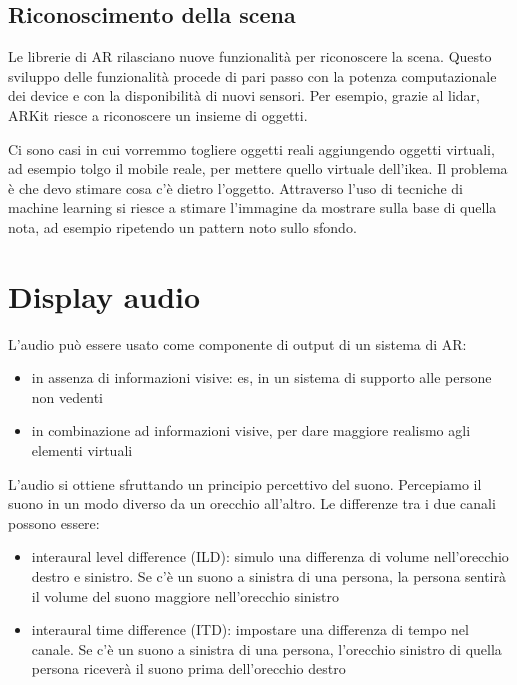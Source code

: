 \subsection{Riconoscimento della scena}
Le librerie di AR rilasciano nuove funzionalità per riconoscere la scena. 
Questo sviluppo delle funzionalità procede di pari passo con la potenza computazionale dei device e con la disponibilità di nuovi sensori. 
Per esempio, grazie al lidar, ARKit riesce a riconoscere un insieme di oggetti. 

Ci sono casi in cui vorremmo togliere oggetti reali aggiungendo oggetti virtuali, ad esempio tolgo il mobile reale, per mettere quello virtuale dell'ikea. 
Il problema è che devo stimare cosa c'è dietro l'oggetto.  Attraverso l'uso di tecniche di machine learning si riesce a stimare l'immagine da mostrare sulla base di quella nota, ad esempio ripetendo un pattern noto sullo sfondo.

\section{Display audio}
L'audio può essere usato come componente di output di un sistema di AR:
\begin{itemize}
    \item in assenza di informazioni visive: es, in un sistema di supporto alle persone non vedenti 
    \item in combinazione ad informazioni visive, per dare maggiore realismo agli elementi virtuali 
\end{itemize}

L'audio si ottiene sfruttando un principio percettivo del suono. Percepiamo il suono in un modo diverso da un orecchio all'altro.
Le differenze tra i due canali possono essere:
\begin{itemize}
    \item interaural level difference (ILD): simulo una differenza di volume nell'orecchio destro e sinistro. Se c'è un suono a sinistra di una persona, la persona sentirà il volume del suono maggiore nell'orecchio sinistro
    \item interaural time difference (ITD): impostare una differenza di tempo nel canale. Se c'è un suono a sinistra di una persona, l'orecchio sinistro di quella persona riceverà il suono prima dell'orecchio destro
\end{itemize}

